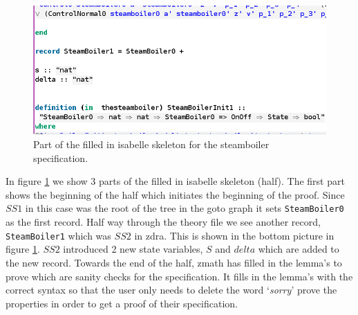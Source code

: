 \begin{figure}[H]
\begin{minipage}{0.53\textwidth}
\end{minipage}\hfill\hfill
\includegraphics[scale=0.4]{Figures/Evaluation/5imageb.png}
\caption{Part of the filled in isabelle skeleton for the steamboiler specification.\label{fig:filledinsteamskeleton}}
\end{figure}

In figure \ref{fig:filledinsteamskeleton} we show 3 parts of the filled in
isabelle skeleton (\gls{half}). The first part shows the beginning of the
\gls{half} which initiates the beginning of the proof. Since $SS1$ in this case
was the root of the tree in the goto graph it sets \verb|SteamBoiler0| as the
first record. Half way through the theory file we see another record,
\verb|SteamBoiler1| which was $SS2$ in \gls{zdra}. This is shown in the bottom
picture in figure \ref{fig:filledinsteamskeleton}. $SS2$ introduced 2 new state
variables, $S$ and $delta$ which are added to the new record. Towards the end of
the \gls{half}, \gls{zmath} has filled in the lemma's to prove which are sanity
checks for the specification. It fills in the lemma's with the correct syntax so
that the user only needs to delete the word `\emph{sorry}' prove the properties
in order to get a proof of their specification. 

